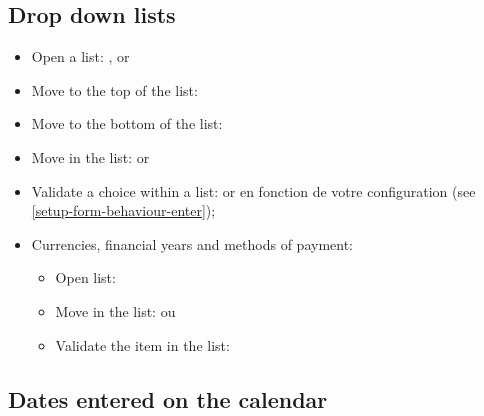 \subsection{Drop down lists}

\begin{itemize}
	\item Open a list: ,  or \keys{\arrowkeydown}
	\item Move to the top of the list: %
	\item Move to the bottom of the list: 
	\item Move in the list: \keys{\arrowkeyup} or \keys{\arrowkeydown}
	\item Validate a choice within a list:  or  en fonction de votre configuration (see \vref{setup-form-behaviour-enter});
	\item Currencies, financial years and methods of payment:%
	\begin{itemize}
		\item Open list: %
		\item Move in the list: \keys{\arrowkeyup} ou \keys{\arrowkeydown}%
		\item Validate the item in the list: %
	\end{itemize}
\end{itemize}

\subsection{Dates entered on the calendar}

